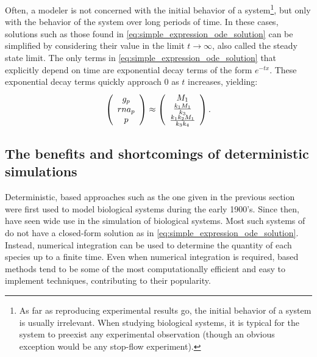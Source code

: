 Often, a modeler is not concerned with the initial behavior of a system\footnote{As far as reproducing experimental results go, the initial behavior of a system is usually irrelevant. When studying biological systems, it is typical for the system to preexist any experimental observation (though an obvious exception would be any stop-flow experiment).}, but only with the behavior of the system over long periods of time. In these cases, solutions such as those found in \eqref{eq:simple_expression_ode_solution} can be simplified by considering their value in the limit $t \rightarrow \infty$, also called the steady state limit. The only terms in \eqref{eq:simple_expression_ode_solution} that explicitly depend on time are exponential decay terms of the form $e^{-t x}$. These exponential decay terms quickly approach $0$ as $t$ increases, yielding:
\begin{gather*}\label{eq:simple_expression_ode_solution_ss}
    \left( \begin{array}{c}
        \con{g_p} \\
        \con{rna_p} \\
        \con{p}
    \end{array} \right) \approx
%
    \left( \begin{array}{c}
        \markmat_1 \\
        \frac{\condetx{1} \markmat_1}{\condetx{3}} \\
        \frac{\condetx{1} \condetx{2} \markmat_1}{\condetx{3} \condetx{4}}
    \end{array} \right).
\end{gather*}

\subsection{The benefits and shortcomings of deterministic simulations}

Deterministic,  based approaches such as the one given in the previous section were first used to model biological systems during the early 1900's\cite{Lotka:1909ho,Lotka:1925tu,Dublin:1925hj,Volterra:1926cl}. Since then,  have seen wide use in the simulation of biological systems. Most such systems of  do not have a closed-form solution as in \eqref{eq:simple_expression_ode_solution}. Instead, numerical integration\cite{Turing:1952df} can be used to determine the quantity of each species up to a finite time. Even when numerical integration is required,  based methods tend to be some of the most computationally efficient and easy to implement techniques, contributing to their popularity.

